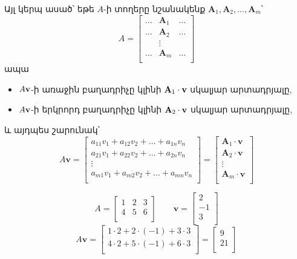 Այլ կերպ ասած՝ եթե $A$-ի տողերը նշանակենք $\mathbf{A}_1, \mathbf{A}_2, \ldots, \mathbf{A}_m$՝
\[
A = \begin{bmatrix}
\dots& \mathbf{A}_1 & \ldots \\
\dots& \mathbf{A}_2 & \ldots \\
 & \vdots &  \\
\dots& \mathbf{A}_m & \ldots \\
\end{bmatrix}
\]
ապա 
\begin{itemize}
\item $A\mathbf{v}$-ի առաջին բաղադրիչը կլինի $\mathbf{A}_1 \cdot \mathbf{v}$ սկալյար արտադրյալը,
\item $A\mathbf{v}$-ի երկրորդ բաղադրիչը կլինի $\mathbf{A}_2 \cdot \mathbf{v}$ սկալյար արտադրյալը,
\end{itemize}
և այդպես շարունակ՝
\[
A\mathbf{v} = \begin{bmatrix}
a_{11}v_1 + a_{12}v_2 + \ldots + a_{1n}v_n \\
a_{21}v_1 + a_{22}v_2 + \ldots + a_{2n}v_n \\
\vdots \\
a_{m1}v_1 + a_{m2}v_2 + \ldots + a_{mn}v_n \\
\end{bmatrix}= \begin{bmatrix}
\mathbf{A}_1 \cdot \mathbf{v} \\
\mathbf{A}_2 \cdot \mathbf{v} \\
\vdots \\
\mathbf{A}_m \cdot \mathbf{v} \\
\end{bmatrix} 
\]

\begin{example}
\[
  A = \begin{bmatrix}
    1 & 2 & 3 \\
    4 & 5 & 6 \\
  \end{bmatrix}
  \qquad
  \mathbf{v} = \begin{bmatrix}
    2 \\
    -1 \\
    3 \\
  \end{bmatrix}
\]
\[
  A\mathbf{v} = \begin{bmatrix}
    1 \cdot 2 + 2 \cdot (-1) + 3 \cdot 3 \\
    4 \cdot 2 + 5 \cdot (-1) + 6 \cdot 3 \\
  \end{bmatrix}
  = \begin{bmatrix}
    9 \\
    21 \\
  \end{bmatrix}
\]
\end{example}

